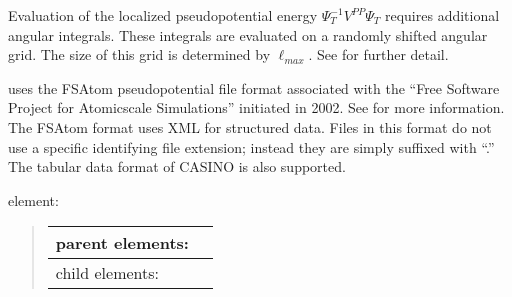 \documentclass[letterpaper,10pt,english]{sphinxmanual}
\begin{document}
Evaluation of the localized pseudopotential energy
\(\Psi_T^{-1}V^{PP}\Psi_T\) requires additional angular integrals.
These integrals are evaluated on a randomly shifted angular grid. The
size of this grid is determined by \(\ell_{max}\). See
 for further detail.

uses the FSAtom pseudopotential file format associated with the “Free
Software Project for Atomic\sphinxhyphen{}scale Simulations” initiated in 2002. See
 for more information. The
FSAtom format uses XML for structured data. Files in this format do not
use a specific identifying file extension; instead they are simply
suffixed with “.” The tabular data format of CASINO is also
supported.

 element:
\begin{quote}


\begin{savenotes}\sphinxattablestart
\centering
\begin{tabulary}{\linewidth}[t]{|T|T|}
\hline

parent elements:
&
\\
\hline
child elements:
&
\\
\hline
\end{tabulary}
\par
\sphinxattableend\end{savenotes}
\end{quote}
\end{document}
